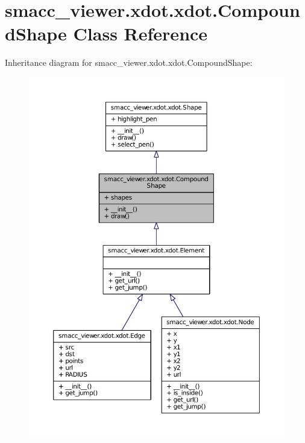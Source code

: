 \hypertarget{classsmacc__viewer_1_1xdot_1_1xdot_1_1CompoundShape}{}\section{smacc\+\_\+viewer.\+xdot.\+xdot.\+Compound\+Shape Class Reference}
\label{classsmacc__viewer_1_1xdot_1_1xdot_1_1CompoundShape}


Inheritance diagram for smacc\+\_\+viewer.\+xdot.\+xdot.\+Compound\+Shape\+:
\nopagebreak
\begin{figure}[H]
\begin{center}
\leavevmode
\includegraphics[width=350pt]{classsmacc__viewer_1_1xdot_1_1xdot_1_1CompoundShape__inherit__graph}
\end{center}
\end{figure}


